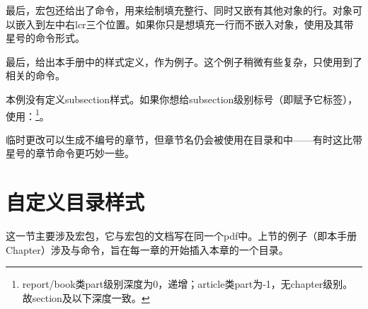 最后，宏包还给出了命令，用来绘制填充整行、同时又嵌有其他对象的行。对象可以嵌入到左中右lcr三个位置。如果你只是想填充一行而不嵌入对象，使用及其带星号的命令形式。
\begin{latex}
\end{latex}

最后，给出本手册中的样式定义，作为例子。这个例子稍微有些复杂，只使用到了相关的命令。

本例没有定义subsection样式。如果你想给subsection级别标号（即赋予它标签），使用：\footnote{report/book类part级别深度为0，递增；article类part为-1，无chapter级别。故section及以下深度一致。}。

临时更改可以生成不编号的章节，但章节名仍会被使用在目录和中——有时这比带星号的章节命令更巧妙一些。

\section{自定义目录样式}
\label{sec:titletoc}
这一节主要涉及宏包，它与宏包的文档写在同一个pdf中。上节的例子（即本手册Chapter）涉及与命令，旨在每一章的开始插入本章的一个目录。

